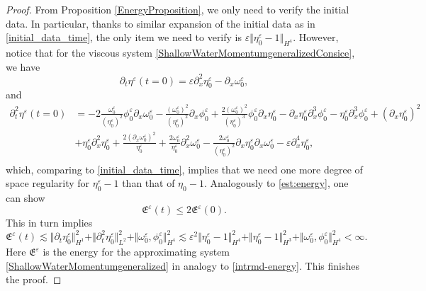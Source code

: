 \documentclass[reqno,11pt]{amsart}
\newcommand{\norm}[2]{\Vert #1 \Vert_{#2}}
\theoremstyle{plain}
\theoremstyle{definition}
\numberwithin{equation}{section}
\begin{document}
\begin{proof}
From Proposition \ref{EnergyProposition}, we only need to verify the initial data. In particular, thanks to similar expansion of the initial data as in \eqref{initial_data_time}, the only item we need to verify is $\varepsilon \norm{ \eta_0^{\varepsilon}-1}{H^4}$. However, notice that for the viscous system \eqref{ShallowWaterMomentumgeneralizedConsice}, we have
\[
\partial_t \eta^{\varepsilon}(t=0)=\varepsilon \partial_x^2 \eta^{\varepsilon}_0-\partial_x\omega^{\varepsilon}_0,
\]
and
\begin{align*}
    \partial_t^2 \eta^{\varepsilon}(t=0) &= -2\frac{\omega_0^{\varepsilon} }{(\eta_0^{\varepsilon})^2} \phi_0^{\varepsilon}\partial_x \omega_0^{\varepsilon}-\frac{(\omega_0^{\varepsilon})^2}{(\eta_0^{\varepsilon})^2 }\partial_x \phi_0^{\varepsilon}+\frac{2(\omega_0^{\varepsilon})^2}{(\eta_0^{\varepsilon})^3}\phi^{\varepsilon}_0\partial_x\eta^{\varepsilon}_0-\partial_x\eta_0^{\varepsilon} \partial_x^3\phi_0^{\varepsilon}-\eta_0^{\varepsilon}\partial_x^3 \phi_0^\varepsilon+(\partial_x\eta_0^{\varepsilon})^2  \\
    & +\eta_0^{\varepsilon}\partial_x^2 \eta^{\varepsilon}_0+\frac{2(\partial_x\omega_0^{\varepsilon})^2}{\eta_0^{\varepsilon}}+\frac{2\omega_0^{\varepsilon}}{\eta_0^{\varepsilon}}\partial_x^2 \omega_0^{\varepsilon}-\frac{2\omega_0^{\varepsilon}}{(\eta_0^{\varepsilon})^2 } \partial_x \eta^{\varepsilon}_0\partial_x \omega^{\varepsilon}_0-\varepsilon\partial_x^4\eta_0^{\varepsilon}, \\
\end{align*}
which, comparing to \eqref{initial_data_time}, implies that we need one more degree of space regularity for $\eta^{\varepsilon}_0-1$ than that of $\eta_0-1.$ %
Analogously to \eqref{est:energy}, one can show
\[
\mathfrak E^{\varepsilon}(t)\leq 2\mathfrak E^{\varepsilon}(0).
\]
This in turn implies
\[
\mathfrak E^{\varepsilon}(t)\lesssim \norm{\partial_t \eta_0^{\varepsilon}}{H^1}^2+\norm{\partial_t^2 \eta_0^{\varepsilon}}{L^2}^2+\norm{\omega_0^{\varepsilon}, \phi_0^{\varepsilon}}{H^4}^2\lesssim \varepsilon^2 \norm{\eta_0^{\varepsilon}-1}{H^4}^2+\norm{\eta_0^{\varepsilon}-1}{H^3}^2+\norm{\omega^{\varepsilon}_0,\phi_0^{\varepsilon}}{H^4}^2<\infty.
\]
Here $ \mathfrak E^\varepsilon $ is the energy for the approximating system \eqref{ShallowWaterMomentumgeneralized} in analogy to \eqref{intrmd-energy}. This finishes the proof. 
\end{proof}
\end{document}
